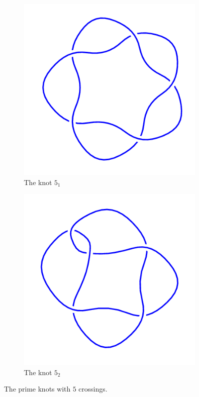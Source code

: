 \documentclass[12pt,letterpaper]{article}
\theoremstyle{definition}
\begin{document}
\begin{figure}[h]
    \centering
    \begin{subfigure}{.4\textwidth}
        \centering
        \includegraphics[width=\textwidth]{knotpics/5_1.png}
        \caption{The knot $5_1$}
    \end{subfigure}
    \hspace{1in}
    \begin{subfigure}{.4\textwidth}
        \centering
        \includegraphics[width=\textwidth]{knotpics/5_2.png}
        \caption{The knot $5_2$}
    \end{subfigure}
    \caption{The prime knots with $5$ crossings.}
\end{figure}
\end{document}
